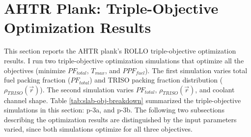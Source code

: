 \section{AHTR Plank: Triple-Objective Optimization Results}
\label{sec:plank-three-obj}
This section reports the \gls{AHTR} plank's \gls{ROLLO} triple-objective 
optimization results. 
I run two triple-objective optimization simulations that optimize all the 
objectives (minimize $PF_{total}$, $T_{max}$, and $PPF_{fuel}$). 
The first simulation varies total fuel packing fraction ($PF_{total}$) and \gls{TRISO} 
packing fraction distribution ($\rho_{TRISO}(\vec{r})$).
The second simulation varies $PF_{total}$, $\rho_{TRISO}(\vec{r})$, and coolant channel 
shape. 
Table \ref{tab:slab-obj-breakdown} summarized the triple-objective simulations in this 
section: p-3a, and p-3b. 
The following two subsections describing the optimization results are distinguished 
by the input parameters varied, since both simulations optimize for all three 
objectives. 


